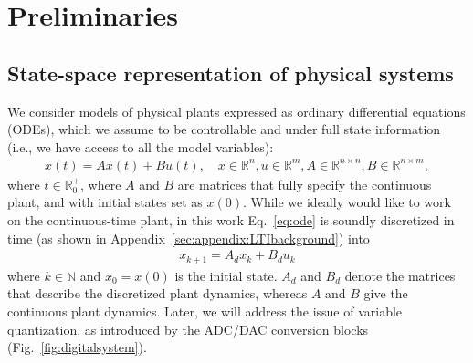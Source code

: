 \documentclass[runningheads,a4paper]{llncs}
\newcommand{\addtodo}[1]{{\color{red} TODO: #1}}
\begin{document}

\section{Preliminaries}
\label{sec:preliminaries}

\subsection{State-space representation of physical systems} 
\label{ssec:ssrepresentation}

We consider models of physical plants expressed as ordinary differential
equations (ODEs), which we assume to be controllable and under full state
information (i.e., we have access to all the model variables):
%
\begin{align}
\label{eq:ode}
\dot{x}(t) = Ax(t)+ B u(t), \quad x \in \mathbb{R}^{n}, u \in \mathbb{R}^m, A \in \mathbb{R}^{n \times n}, B \in \mathbb{R}^{n \times m}, 
\end{align}
%
where $t \in \mathbb R_0^+$, where $A$ and $B$ are matrices that fully
specify the continuous plant, and with initial states set as $x(0)$.  While
we ideally would like to work on the continuous-time plant, in this work
Eq.~\eqref{eq:ode} is soundly discretized in time (as shown in
Appendix~\ref{sec:appendix:LTIbackground}) into
%
%
\begin{align}
\label{eq:plant}
x_{k+1} = A_d x_k+ B_d u_k
\end{align} 
%
where $k \in \mathbb N$ and $x_{0}=x(0)$ is the initial state.  $A_d$ and
$B_d$ denote the matrices that describe the discretized plant dynamics,
whereas $A$ and $B$ give the continuous plant dynamics.  Later, we will
address the issue of variable quantization, as introduced by the ADC/DAC
conversion blocks (Fig.~\ref{fig:digitalsystem}).
\end{document}
